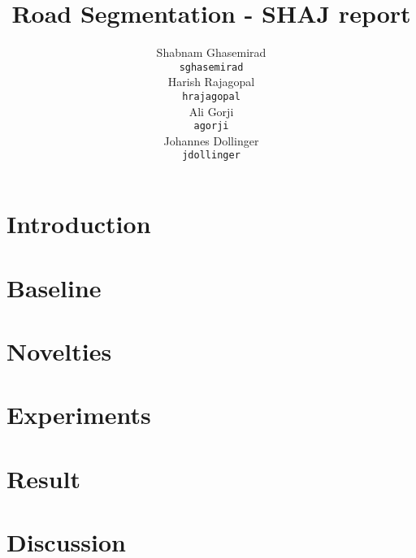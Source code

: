\documentclass{article}
\title{Road Segmentation - SHAJ report}
\author{
  Shabnam Ghasemirad\\
  \texttt{sghasemirad} \\
   \And
  Harish Rajagopal \\
  \texttt{hrajagopal} \\
   \And
  Ali Gorji \\
  \texttt{agorji} \\
   \And
  Johannes Dollinger \\
  \texttt{jdollinger} \\
}
\begin{document}
\maketitle

\section{Introduction} \label{intro}


\section{Baseline}\label{section:baselines}


\section{Novelties}


\section{Experiments}\label{section:experiments}



\section{Result}\label{section:results}

\section{Discussion}\label{section:model}


\newpage

\small
\printbibliography{}
\end{document}
